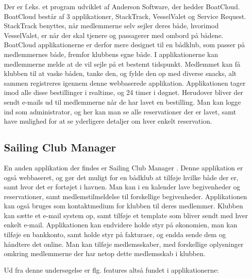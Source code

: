 Der er f.eks. et program udviklet af Anderson Software, der hedder BoatCloud.\citep{BoatCloud} BoatCloud består af 3
applikationer, StackTrack, VesselValet og Service Request.  
StackTrack benyttes, når medlemmerne selv sejler deres både,
hvorimod VesselValet, er når der skal tjenere og passagerer med ombord på bådene. BoatCloud applikationerne er derfor
mere designet til en bådklub, som passer på medlemmernes både, fremfor klubbens egne både. I
applikationerne kan medlemmerne melde at de vil sejle på et bestemt tidspunkt. Medlemmet kan få klubben til at vaske
båden, tanke den, og fylde den op med diverse snacks, alt sammen registreres igennem denne webbaserede applikation.
Applikationen tager imod alle disse bestillinger i realtime, og 24 timer i døgnet. Herudover bliver der sendt e-mails ud
til medlemmerne når de har lavet en bestilling. Man kan logge ind som administrator, og her kan man se alle
reservationer der er lavet, samt have mulighed for at se yderligere detaljer om hver enkelt reservation.


\subsection*{Sailing Club Manager}

En anden applikation der findes er Sailing Club Manager \citep{SailClub}. Denne applikation er også webbaseret, og gør
det muligt for en bådklub at tilføje hvilke både der er, samt hvor det er fortøjet i havnen. Man kan i en kalender lave
begivenheder og reservationer, samt medlemstilmeldelse til forskellige begivenheder. Applikationen kan også bruges som kontaktmedium for
klubben til deres medlemmer. Klubben kan sætte et e-mail system op, samt tilføje et template som bliver sendt med hver
enkelt e-mail. Applikationen kan endvidere holde styr på økonomien, man kan tilføje en bankkonto, samt  holde styr på
fakturaer, og endda sende dem og håndtere det online. Man kan tilføje medlemsskaber, med forskellige oplysninger omkring
medlemmerne der har netop dette medlemsskab i klubben.

Ud fra denne undersøgelse er flg. features altså fundet i applikationerne:

